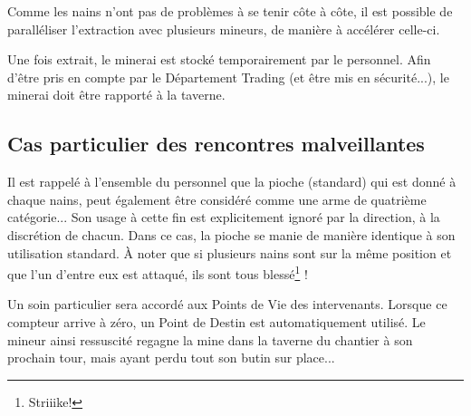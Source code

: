 Comme les nains n'ont pas de problèmes à se tenir côte à côte, il est possible de paralléliser l'extraction avec plusieurs mineurs, de manière à accélérer celle-ci.

Une fois extrait, le minerai est stocké temporairement par le personnel. Afin d'être pris en compte par le Département Trading (et être mis en sécurité...), le minerai doit être rapporté à la taverne.

\subsection{Cas particulier des rencontres malveillantes}
Il est rappelé à l'ensemble du personnel que la pioche (standard) qui est donné à chaque nains, peut également être considéré comme une arme de quatrième catégorie... Son usage à cette fin est explicitement ignoré par la direction, à la discrétion de chacun. Dans ce cas, la pioche se manie de manière identique à son utilisation standard. À noter que si plusieurs nains sont sur la même position et que l'un d'entre eux est attaqué, ils sont tous blessé\footnote{Striiike!} !

Un soin particulier sera accordé aux Points de Vie des intervenants. Lorsque ce compteur arrive à zéro, un Point de Destin est automatiquement utilisé. Le mineur ainsi ressuscité regagne la mine dans la taverne du chantier à son prochain tour, mais ayant perdu tout son butin sur place...

